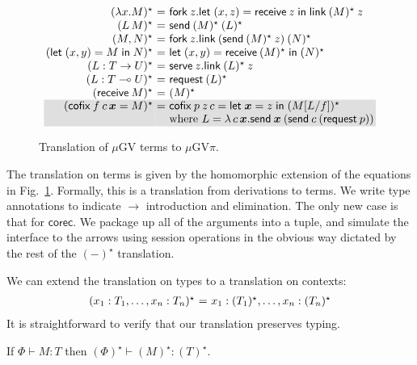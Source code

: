 \documentclass[orivec,envcountsame]{llncs}
\makeatletter
\newcommand{\gvdual}[1]{\overline{#1}}
\newcommand{\lto}{\ensuremath{\multimap}}
\newcommand{\uto}{\ensuremath{\rightarrow}}
\newcommand{\outterm}{\mathrm{end}_!}
\newcommand{\gvtyp}[3]{#1 \vdash #2 : #3}
\newcommand{\mkwd}[1]{\mathsf{#1}}
\newcommand{\gvsend}[2]{\mkwd{send}\:#1\:#2}
\newcommand{\gvreceive}[1]{\mkwd{receive}\:#1}
\newcommand{\gvlet}[3]{\mkwd{let}\;#1 = #2\;\mkwd{in}\;#3}
\newcommand{\gvlink}[2]{\mkwd{link}\:#1\:#2}
\newcommand{\gvfork}[2]{\mkwd{fork}\:#1.#2}
\newcommand{\lrkwd}{\mkwd{cofix}}
\newcommand{\gvfix}[3]{\lrkwd\:#1\:#2 = #3}
\newcommand{\gvserve}[2]{\mkwd{serve}\:#1.#2}
\newcommand{\gvrequest}[1]{\mkwd{request}\:#1}
\newcommand{\key}{\mkwd}
\newcommand{\topi}[1]{({#1})^\star}
\newcommand{\mugv}{$\mu\mathrm{GV}$\xspace}
\newcommand{\gvpi}{$\mu\mathrm{GV}\pi$\xspace}
\newcommand{\ba}{\begin{array}}
\newcommand{\ea}{\end{array}}
\newenvironment{equations}{\[\ba{@{}r@{~}c@{~}l@{}}}{\ea\]}
\newcommand\shaderow{\noalign{\vskip-0.4pt}\rowcolor{shade}[0.6mm]}
\makeatother
\begin{document}
\begin{figure}[float]\small
\begin{equations}
\topi{\lambda x.M} &=& \gvfork{z}{\gvlet{(x, z)}{\gvreceive{z}}{\gvlink{\topi{M}}{z}}} \\
\topi{L\,M} &=& \gvsend{\topi{M}}{\topi{L}} \\
\topi{M, N} &=&
  \gvfork{z}
    {\gvlink{(\gvsend{\topi{M}}{z})}{\topi{N}}} \\
\topi{\gvlet{(x, y)}{M}{N}} &=&
    \gvlet{(x, y)}{\gvreceive{\topi{M}}}{\topi{N}} \\
\topi{L : T \uto U} &=&
  \gvserve{z}{\gvlink{\topi{L}}{z}} \\
\topi{L : T \lto U} &=& \gvrequest{\topi{L}} \\
\topi{\gvreceive{M}} &=& \topi{M}
\\ \shaderow
\topi{\gvfix{f}{c\,\vec{x}}{M}} &=&
  \gvfix{p}{z\,c}{\gvlet{\vec{x}}{z}{\topi{M[L/f]}}} \\ \shaderow
&& \text{where }L = \lambda\,c\,\vec{x}.\gvsend{\vec{x}}{(\gvsend{c}{(\gvrequest{p})})} \\
\end{equations}%
\caption{Translation of \mugv terms to \gvpi.}\label{fig:togvpi}
\end{figure}

The translation on terms is given by the homomorphic extension of the equations in
Fig.~\ref{fig:togvpi}.  Formally, this is a translation from derivations to terms. We write type
annotations to indicate $\to$ introduction and elimination.
%
The only new case is that for $\key{corec}$. We package up all of the arguments into a tuple, and
simulate the interface to the arrows using session operations in the obvious way dictated by the
rest of the $\topi{-}$ translation.

We can extend the translation on types to a translation on contexts:
\begin{equations}
\topi{x_1:T_1, \dots, x_n:T_n} &=& x_1:\topi{T_1}, \dots, x_n:\topi{T_n} \\
\end{equations}%
It is straightforward to verify that our translation preserves typing.
\begin{theorem}
If $\gvtyp{\Phi}{M}{T}$ then $\gvtyp{\topi{\Phi}}{\topi{M}}{\topi{T}}$.
\end{theorem}
\end{document}
